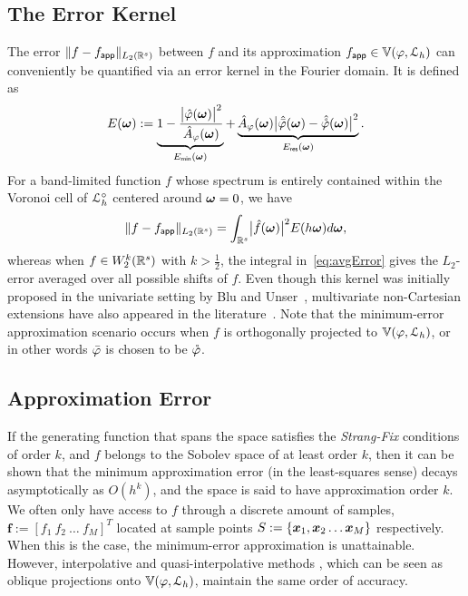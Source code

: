 \subsection{The Error Kernel}
The error $\lVert f - f_{\mathsf{app}} \rVert_{L_2(\mathbb{R}^s)}$ between $f$ and its approximation $f_{\mathsf{app}} \in \mathbb{V}({\varphi},{\mathcal{L}_h})$ can conveniently be quantified via an error kernel in the Fourier domain. 
It is defined as
\begin{equation}
	E(\vect{\omega}) := \underbrace{1 - \frac{\abs{\ft{\varphi}(\vect{\omega})}^2}{\ft{A}_{\varphi}(\vect{\omega})}}_{E_{\mathsf{min}}(\vect{\omega})}
	+ 
	\underbrace{
	\ft{A}_{\varphi}(\vect{\omega})
	\abs{\ft{\analysis{\varphi}}(\vect{\omega}) -
 		\ft{\dual{\varphi}}(\vect{\omega})}^2
  	}_{E_{\mathsf{res}}(\vect{\omega})}.
  \label{eq:scErrorKernel}
\end{equation}
For a band-limited function $f$ whose spectrum is entirely contained within the Voronoi cell of $\mathcal{L}^{\circ}_h$ centered around $\boldsymbol{\omega} = 0$, we have 
\begin{equation}
	\Ltwonorm{f - \appf{f}} = \int_{\reel^s}
	\abs{\ft{f}(\vect{\omega})}^2 E(h\vect{\omega}) d\vect{\omega},
	\label{eq:avgError}
\end{equation}
whereas when $f \in W_2^k(\mathbb{R}^s)$ with $k > \frac{1}{2}$, the integral in~\eqref{eq:avgError} gives the $L_2$-error averaged over all possible shifts of $f$. 
Even though this kernel was initially proposed in the univariate setting by Blu and Unser~\cite{blu99}, multivariate non-Cartesian extensions have also appeared in the literature~\cite{condat05hexagonal, condat07, condat08, alim10, condat11}. 
Note that the minimum-error approximation scenario occurs when $f$ is orthogonally projected to $\mathbb{V}({\varphi},{\mathcal{L}_h})$, or in other words ${\bar{\varphi}}$ is chosen to be ${\mathring{\varphi}}$.
 
\subsection{Approximation Error}
If the generating function that spans the space satisfies the \emph{Strang-Fix} conditions of order $k$, and $f$ belongs to the Sobolev space of at least order $k$, then it can be shown that the minimum approximation error (in the least-squares sense) decays asymptotically as $O(h^k)$, and the space is said to have approximation order $k$. 
We often only have access to $f$ through a discrete amount of samples, $\mathbf{f} := \left[ f_1 \ f_2 \ \hdots \ f_M \right]^T$ located at sample points $S := \{\boldsymbol{x}_1, \boldsymbol{x}_2 \hdots \boldsymbol{x}_M \}$ respectively. 
When this is the case, the minimum-error approximation is unattainable. 
However, interpolative and quasi-interpolative methods \cite{quasibcc,interprev}, which can be seen as oblique projections onto $\mathbb{V}({\varphi},{\mathcal{L}_h})$, maintain the same order of accuracy.

